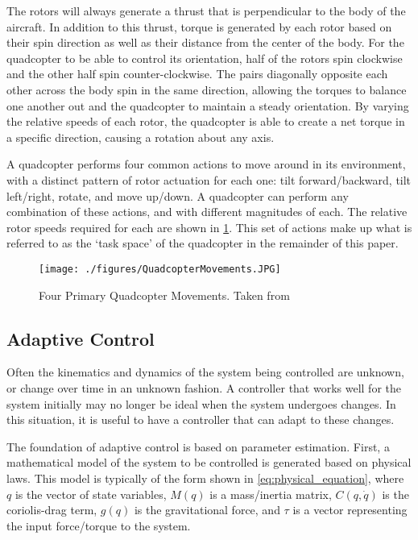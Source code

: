 \documentclass[letterpaper, 10 pt, conference]{ieeeconf}  %
\begin{document}
The rotors will always generate a thrust that is perpendicular to the body of the aircraft. 
In addition to this thrust, torque is generated by each rotor based on their spin direction  as well as their distance from the center of the body.
For the quadcopter to be able to control its orientation, half of the rotors spin clockwise and the other half spin counter-clockwise. 
The pairs diagonally opposite each other across the body spin in the same direction, allowing the torques to balance one another out and the quadcopter to maintain a steady orientation. 
By varying the relative speeds of each rotor, the quadcopter is able to create a net torque in a specific direction, causing a rotation about any axis.

A quadcopter performs four common actions to move around in its environment, with a distinct pattern of rotor actuation for each one: 
tilt forward/backward, tilt left/right, rotate, and move up/down. 
A quadcopter can perform any combination of these actions, and with different magnitudes of each. The relative rotor speeds required for each are shown in \ref{fig:actions}. This set of actions make up what is referred to as the `task space' of the quadcopter in the remainder of this paper.

\begin{figure}
\centering
\texttt{[image: ./figures/QuadcopterMovements.JPG]}
\caption{Four Primary Quadcopter Movements. Taken from \cite{harsha}}
\label{fig:actions}
\end{figure}

\subsection{Adaptive Control}

Often the kinematics and dynamics of the system being controlled are unknown, or change over time in an unknown fashion. 
A controller that works well for the system initially may no longer be ideal when the system undergoes changes. 
In this situation, it is useful to have a controller that can adapt to these changes.

The foundation of adaptive control is based on parameter estimation.
First, a mathematical model of the system to be controlled is generated based on physical laws.
This model is typically of the form shown in \eqref{eq:physical_equation}, where $q$ is the vector of state variables, $M(q)$ is a mass/inertia matrix, $C(q,\dot{q})$ is the coriolis-drag term, $g(q)$ is the gravitational force, and $\tau$ is a vector representing the input force/torque to the system.
\end{document}
